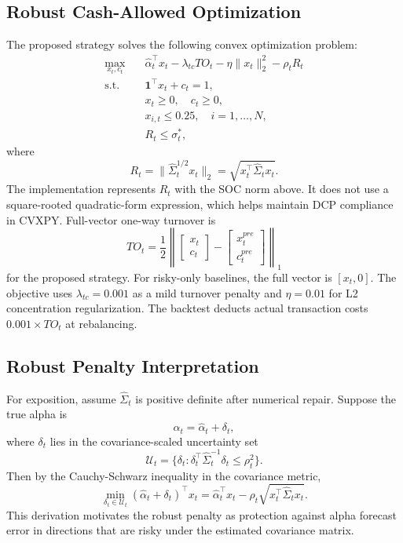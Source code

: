 \documentclass[11pt]{article}
\begin{document}
\subsection{Robust Cash-Allowed Optimization}

The proposed strategy solves the following convex optimization problem:
\begin{align}
\max_{x_t,c_t}\quad
&\hat{\alpha}_t^\top x_t
-\lambda_{tc}TO_t
-\eta\|x_t\|_2^2
-\rho_t R_t \\
\text{s.t.}\quad
&\mathbf{1}^\top x_t+c_t=1,\\
&x_t\ge0,\quad c_t\ge0,\\
&x_{i,t}\le0.25,\quad i=1,\ldots,N,\\
&R_t\le\sigma_t^*,
\end{align}
where
\begin{equation}
R_t=\|\hat{\Sigma}_t^{1/2}x_t\|_2
=\sqrt{x_t^\top\hat{\Sigma}_t x_t}.
\end{equation}
The implementation represents \(R_t\) with the SOC norm above. It does not use a
square-rooted quadratic-form expression, which helps maintain DCP compliance in
CVXPY. Full-vector one-way turnover is
\begin{equation}
TO_t=\frac12
\left\|
\begin{bmatrix}x_t\\c_t\end{bmatrix}
-
\begin{bmatrix}x_t^{pre}\\c_t^{pre}\end{bmatrix}
\right\|_1
\end{equation}
for the proposed strategy. For risky-only baselines, the full vector is \([x_t,0]\).
The objective uses \(\lambda_{tc}=0.001\) as a mild turnover penalty and
\(\eta=0.01\) for L2 concentration regularization. The backtest deducts actual
transaction costs \(0.001\times TO_t\) at rebalancing.

\subsection{Robust Penalty Interpretation}

For exposition, assume \(\hat{\Sigma}_t\) is positive definite after numerical
repair. Suppose the true alpha is
\begin{equation}
\alpha_t=\hat{\alpha}_t+\delta_t,
\end{equation}
where \(\delta_t\) lies in the covariance-scaled uncertainty set
\begin{equation}
\mathcal{U}_t=
\{\delta_t:\delta_t^\top\hat{\Sigma}_t^{-1}\delta_t\le\rho_t^2\}.
\end{equation}
Then by the Cauchy-Schwarz inequality in the covariance metric,
\begin{equation}
\min_{\delta_t\in\mathcal{U}_t}
(\hat{\alpha}_t+\delta_t)^\top x_t
=
\hat{\alpha}_t^\top x_t
-\rho_t\sqrt{x_t^\top\hat{\Sigma}_t x_t}.
\end{equation}
This derivation motivates the robust penalty as protection against alpha forecast
error in directions that are risky under the estimated covariance matrix.
\end{document}
